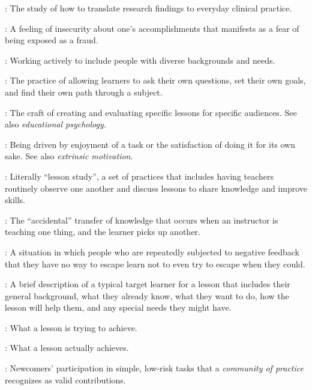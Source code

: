 \begin{description}
: The study
of how to translate research findings to everyday clinical practice.

: A feeling of
insecurity about one's accomplishments that manifests as a fear of being
exposed as a fraud.

: Working actively to include
people with diverse backgrounds and needs.

: The
practice of allowing learners to ask their own questions, set their own
goals, and find their own path through a subject.

: The craft of
creating and evaluating specific lessons for specific audiences. See
also \emph{educational psychology}.

: Being driven
by enjoyment of a task or the satisfaction of doing it for its own sake.
See also \emph{extrinsic motivation}.

: Literally ``lesson study'', a set
of practices that includes having teachers routinely observe one another
and discuss lessons to share knowledge and improve skills.

:
The ``accidental'' transfer of knowledge that occurs when an instructor is
teaching one thing, and the learner picks up another.

: A situation
in which people who are repeatedly subjected to negative feedback that
they have no way to escape learn not to even try to escape when they
could.

: A brief description of
a typical target learner for a lesson that includes their general
background, what they already know, what they want to do, how the lesson
will help them, and any special needs they might have.

: What a lesson is
trying to achieve.

: What a lesson
actually achieves.

:
Newcomers' participation in simple, low-risk tasks that a \emph{community
of practice} recognizes as valid contributions.


\end{description}
